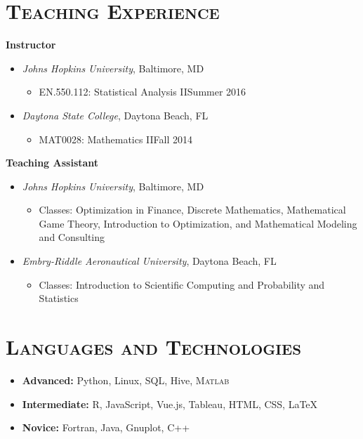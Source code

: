 \documentclass[10pt]{article}
\begin{document}
\section*{\textsc{Teaching Experience}}
\textbf{Instructor}
\begin{itemize}[noitemsep]
    \item[] \textit{Johns Hopkins University}, Baltimore, MD
    \begin{itemize}[noitemsep]
        \item EN.550.112: Statistical Analysis II\hfill Summer 2016
    \end{itemize}
    \vspace{1ex}
    \item[] \textit{Daytona State College}, Daytona Beach, FL
    \begin{itemize}[noitemsep]
        \item MAT0028: Mathematics II\hfill Fall 2014
    \end{itemize}
\end{itemize}
\textbf{Teaching Assistant}
\begin{itemize}[noitemsep]
    \item[] \textit{Johns Hopkins University}, Baltimore, MD
    \begin{itemize}[noitemsep]
        \item[] Classes: Optimization in Finance, Discrete Mathematics, Mathematical Game Theory, Introduction to Optimization, and Mathematical Modeling and Consulting
    \end{itemize}
    \vspace{1ex}
    \item[] \textit{Embry-Riddle Aeronautical University}, Daytona Beach, FL
    \begin{itemize}[noitemsep]
        \item[] Classes: Introduction to Scientific Computing and Probability and Statistics
    \end{itemize}
\end{itemize}

\section*{\textsc{Languages and Technologies}}
\begin{itemize}
    \item[] \textbf{Advanced:} Python, Linux, SQL, Hive, \textsc{Matlab}
    \item[] \textbf{Intermediate:} \textsc{R}, JavaScript, Vue.js, Tableau, HTML, CSS, \LaTeX{}
    \item[] \textbf{Novice:} Fortran, Java, Gnuplot, \textsc{C++}
\end{itemize}
\end{document}
